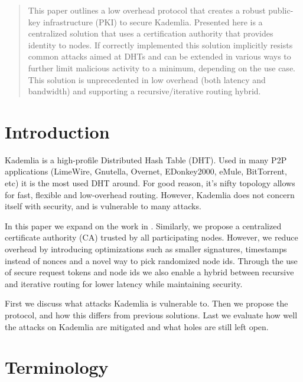 \documentclass[12pt]{article}
\begin{document}
\maketitle

\begin{abstract}
\noindent This paper outlines a low overhead protocol that creates a
robust public-key infrastructure (PKI) to secure Kademlia.  Presented here is a
centralized solution that uses a certification authority that provides identity
to nodes. If correctly implemented this solution implicitly resists common
attacks aimed at DHTs and can be extended in various ways to further limit
malicious activity to a minimum, depending on the use case.  This solution is
unprecedented in low overhead (both latency and bandwidth) and supporting a
recursive/iterative routing hybrid.
\end{abstract}

\section{Introduction}\label{introduction} Kademlia \cite{kademlia} is a
high-profile Distributed Hash Table (DHT). Used in many P2P applications
(LimeWire, Gnutella, Overnet, EDonkey2000, eMule, BitTorrent, etc) it is the
most used DHT around. For good reason, it's nifty topology allows for fast,
flexible and low-overhead routing. However, Kademlia does not concern itself
with security, and is vulnerable to many attacks.

In this paper we expand on the work in \cite{aiello2008tempering}. Similarly,
we propose a centralized certificate authority (CA) trusted by all
participating nodes.  However, we reduce overhead by introducing optimizations
such as smaller signatures, timestamps instead of nonces and a novel way to
pick randomized node ids. Through the use of secure request tokens and node ids
we also enable a hybrid between recursive and iterative routing for lower
latency while maintaining security.

First we discuss what attacks Kademlia is vulnerable to. Then we propose the protocol, and how this differs from previous solutions. Last we evaluate how well the attacks on Kademlia are mitigated and what holes are still left open.

\section{Terminology}\label{terminology}
\end{document}
